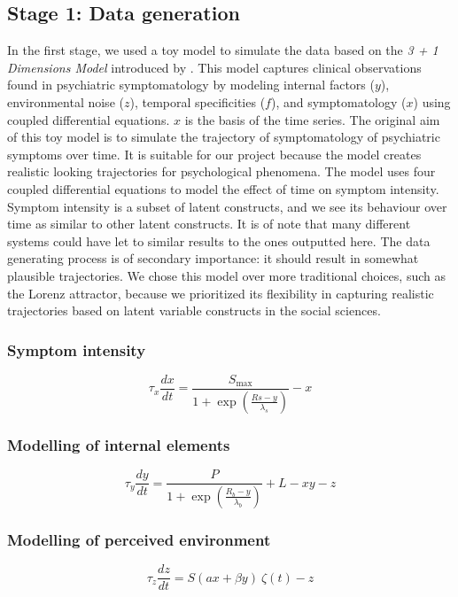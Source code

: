 \documentclass[utf8]{FrontiersinVancouver}
\begin{document}
\subsection{Stage 1: Data generation}
In the first stage, we used a toy model to simulate the data based on the \textit{3 + 1 Dimensions Model} introduced by \citep{gauldDynamicalSystemsComputational2023}. This model captures clinical observations found in psychiatric symptomatology by modeling internal factors ($y$), environmental noise ($z$), temporal specificities ($f$), and symptomatology ($x$) using coupled differential equations. $x$ is the basis of the time series. The original aim of this toy model is to simulate the trajectory of symptomatology of psychiatric symptoms over time. It is suitable for our project because the model creates realistic looking trajectories for psychological phenomena. The model uses four coupled differential equations to model the effect of time on symptom intensity. Symptom intensity is a subset of latent constructs, and we see its behaviour over time as similar to other latent constructs. It is of note that many different systems could have let to similar results to the ones outputted here. The data generating process is of secondary importance: it should result in somewhat plausible trajectories. We chose this model over more traditional choices, such as the Lorenz attractor, because we prioritized its flexibility in capturing realistic trajectories based on latent variable constructs in the social sciences.

\subsubsection{Symptom intensity}
\begin{equation}
    \tau_{x}\frac{dx}{dt} = \frac{S_{\max}}{1+\exp(\frac{Rs-y}{\lambda_{s}})} - x
\end{equation}

\subsubsection{Modelling of internal elements}
\begin{equation}
    \tau_{y}\frac{dy}{dt} = \frac{P}{1+\exp(\frac{R_{b}-y}{\lambda_{b}})} + L - xy - z
\end{equation}

\subsubsection{Modelling of perceived environment}
\begin{equation}
    \tau_{z}\frac{dz}{dt} = S(ax + \beta y)\ \zeta(t) - z
\end{equation}
\end{document}
